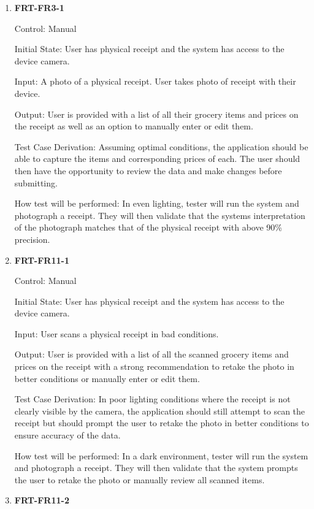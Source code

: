 \documentclass[12pt, titlepage]{article}
\begin{document}
\begin{enumerate}

\item{\textbf{FRT-FR3-1}}

Control: Manual
          
Initial State: User has physical receipt and the system has access to the device camera.
          
Input: A photo of a physical receipt. User takes photo of receipt with their device.
          
Output: User is provided with a list of all their grocery items and prices on the receipt as well as an option to manually enter or edit them.

Test Case Derivation: Assuming optimal conditions, the application should be able to capture the items and corresponding prices
of each. The user should then have the opportunity to review the data and make changes before submitting.
          
How test will be performed: In even lighting, tester will run the system and photograph a receipt. They will then validate that the systems interpretation of the photograph matches that of the physical receipt with above 90\% precision.

\item{\textbf{FRT-FR11-1}}

Control: Manual
          
Initial State: User has physical receipt and the system has access to the device camera.

Input: User scans a physical receipt in bad conditions.
          
Output: User is provided with a list of all the scanned grocery items and prices on the receipt with a strong recommendation to retake the photo in better conditions or manually enter or edit them.

Test Case Derivation: In poor lighting conditions where the receipt is not clearly visible by the camera, the application should still
attempt to scan the receipt but should prompt the user to retake the photo in better conditions to ensure accuracy of the data.
          
How test will be performed: In a dark environment, tester will run the system and photograph a receipt. They will then validate that the system prompts the user to retake the photo or manually review all scanned items.

\item{\textbf{FRT-FR11-2}}


\end{enumerate}
\end{document}
